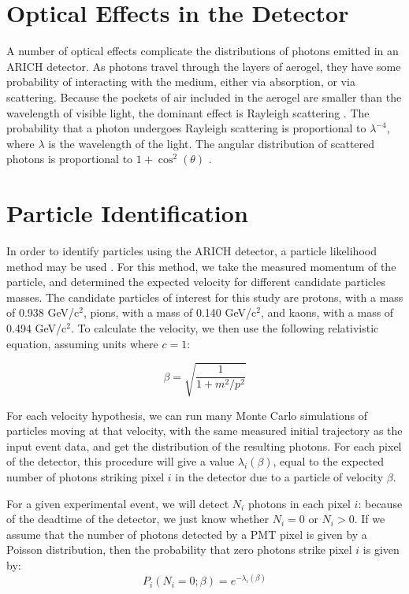 \section{Optical Effects in the Detector}
\label{sec:optics}
A number of optical effects complicate the distributions of photons emitted in an ARICH detector.
As photons travel through the layers of aerogel, they have some probability of interacting with the medium, either via absorption, or via scattering.
Because the pockets of air included in the aerogel are smaller than the wavelength of visible light, the dominant effect is Rayleigh scattering \cite{aerogelRefraction}. 
The probability that a photon  undergoes Rayleigh scattering is proportional to $\lambda^{-4}$, where $\lambda$ is the wavelength of the light.
The angular distribution of scattered photons is proportional to $1 + \cos^2(\theta)$ \cite{rayleigh}.

\section{Particle Identification}
\label{sec:particleIdentification}
In order to identify particles using the \ac{ARICH} detector, a particle likelihood method may be used \cite{richImpact, belleArich}.
For this method, we take the measured momentum of the particle, and determined the expected velocity for different candidate particles masses.
The candidate particles of interest for this study are protons, with a mass of 0.938 GeV/c$^2$, pions, with a mass of 0.140 GeV/c$^2$, and kaons, with a mass of 0.494 GeV/c$^2$.
To calculate the velocity, we then use the following relativistic equation, assuming units where $c = 1$:

\begin{equation}
\label{eq:relMass}
 \beta = \sqrt{\frac{1}{1 +m^2 / p^2}}
\end{equation}

For each velocity hypothesis, we can run many Monte Carlo simulations of particles moving at that velocity, with the same measured initial trajectory as the input event data, and get the distribution of the resulting photons.
For each pixel of the detector, this procedure will give a value $\lambda_i(\beta)$, equal to the expected number of photons striking pixel $i$ in the detector due to a particle of velocity $\beta$. 

For a given experimental event, we will detect $N_i$ photons in each pixel $i$: because of the deadtime of the detector,  we just know whether $N_i = 0$ or $N_i > 0$.
If we assume that the number of photons detected by a PMT pixel is given by a Poisson distribution, then the probability that zero photons strike pixel $i$ is given by:
\begin{equation}
P_i(N_i=0; \beta) = e^{-\lambda_i(\beta)}
\end{equation}

